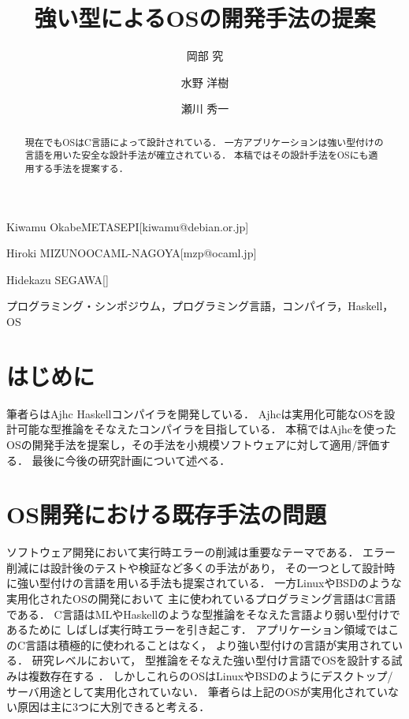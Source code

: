 \documentclass[submit,techreq,noauthor]{ipsj}
\begin{document}
\title{強い型によるOSの開発手法の提案}


\author{岡部 究}{Kiwamu Okabe}{METASEPI}[kiwamu@debian.or.jp]
\author{水野 洋樹}{Hiroki MIZUNO}{OCAML-NAGOYA}[mzp@ocaml.jp]
\author{瀬川 秀一}{Hidekazu SEGAWA}{}[]

\begin{abstract}
現在でもOSはC言語によって設計されている．
一方アプリケーションは強い型付けの言語を用いた安全な設計手法が確立されている．
本稿ではその設計手法をOSにも適用する手法を提案する．
\end{abstract}

\begin{jkeyword}
プログラミング・シンポジウム，プログラミング言語，コンパイラ，Haskell，OS
\end{jkeyword}

\maketitle

\section{はじめに}

筆者らはAjhc Haskellコンパイラ\cite{ajhc}を開発している．
Ajhcは実用化可能なOSを設計可能な型推論をそなえたコンパイラを目指している．
本稿ではAjhcを使ったOSの開発手法を提案し，その手法を小規模ソフトウェアに対して適用/評価する．
最後に今後の研究計画について述べる．

\section{OS開発における既存手法の問題}
\label{sec:problems}

ソフトウェア開発において実行時エラーの削減は重要なテーマである．
エラー削減には設計後のテストや検証など多くの手法があり，
その一つとして設計時に強い型付けの言語を用いる手法も提案されている．
一方LinuxやBSDのような実用化されたOSの開発において
主に使われているプログラミング言語はC言語である．
C言語はMLやHaskellのような型推論をそなえた言語より弱い型付けであるために
しばしば実行時エラーを引き起こす．
アプリケーション領域ではこのC言語は積極的に使われることはなく，
より強い型付けの言語が実用されている．
研究レベルにおいて，
型推論をそなえた強い型付け言語でOSを設計する試みは複数存在する
\cite{snowflake-os}\cite{house}．
しかしこれらのOSはLinuxやBSDのようにデスクトップ/サーバ用途として実用化されていない．
筆者らは上記のOSが実用化されていない原因は主に3つに大別できると考える．
\end{document}
